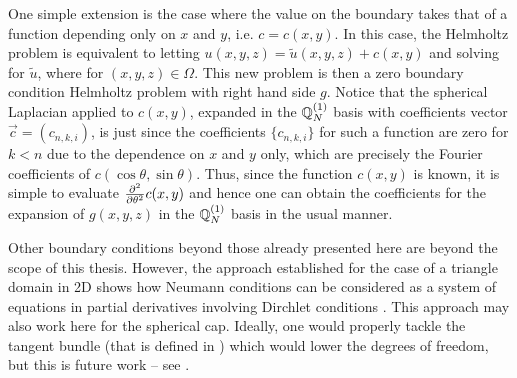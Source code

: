 One simple extension is the case where the value on the boundary takes that of a function depending only on $x$ and $y$, i.e. $c = c(x,y)$. In this case, the Helmholtz problem
is equivalent to letting $u(x,y,z) = \tilde{u}(x,y,z)+ c(x,y)$ and solving
for $\tilde u$, where 
for $(x,y,z) \in \Omega$. This new problem is then a zero boundary condition Helmholtz problem with right hand side $g$. Notice that the spherical Laplacian applied to $c(x,y)$, expanded in the ${\mathbb{Q}}_{N}^{(1)}$ basis with coefficients vector $\vec c = (c_{n,k,i})$, is just
since the coefficients $\{c_{n,k,i}\}$ for such a function are zero for $k < n$ due to the dependence on $x$ and $y$ only, which are precisely the Fourier coefficients of $c(\cos \theta, \sin \theta)$. Thus, since the function $c(x,y)$ is known, it is simple to evaluate ${\partial^{2} \over \partial {\theta}^{2}} c(x,y)$ and hence one can obtain the coefficients for the expansion of $g(x,y,z)$ in the ${\mathbb{Q}}_{N}^{(1)}$ basis in the usual manner.

Other boundary conditions beyond those already presented here are beyond the scope of this thesis. However, the approach established for the case of a triangle domain in 2D shows how Neumann conditions can be considered  as a system of equations in partial derivatives involving Dirchlet conditions \cite{olver2019triangle}. This approach may also work here for the spherical cap. Ideally, one would properly tackle the tangent bundle (that is defined in ) which would lower the degrees of freedom, but this is future work -- see .



